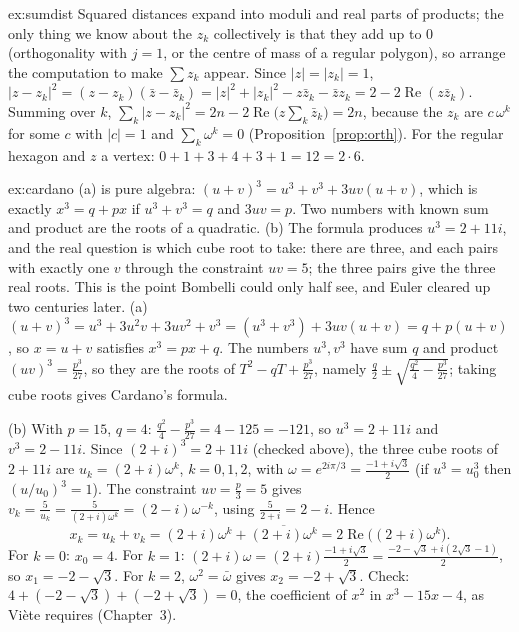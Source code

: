 \begin{solution}{ex:sumdist}
\idea Squared distances expand into moduli and real parts of products; the only thing we know about the $z_k$ collectively is that they add up to $0$ (orthogonality with $j=1$, or the centre of mass of a regular polygon), so arrange the computation to make $\sum z_k$ appear.
\writeup Since $|z|=|z_k|=1$, $|z-z_k|^2=(z-z_k)(\bar z-\bar z_k)=|z|^2+|z_k|^2-z\bar z_k-\bar zz_k=2-2\operatorname{Re}(z\bar z_k)$. Summing over $k$,
$\sum_k|z-z_k|^2=2n-2\operatorname{Re}\bigl(z\sum_k\bar z_k\bigr)=2n$, because the $z_k$ are $c\,\omega^k$ for some $c$ with $|c|=1$ and $\sum_k\omega^k=0$ (Proposition~\ref{prop:orth}). For the regular hexagon and $z$ a vertex: $0+1+3+4+3+1=12=2\cdot6$.
\end{solution}

\begin{solution}{ex:cardano}
\idea (a) is pure algebra: $(u+v)^3=u^3+v^3+3uv(u+v)$, which is exactly $x^3=q+px$ if $u^3+v^3=q$ and $3uv=p$. Two numbers with known sum and product are the roots of a quadratic. (b) The formula produces $u^3=2+11i$, and the real question is which cube root to take: there are three, and each pairs with exactly one $v$ through the constraint $uv=5$; the three pairs give the three real roots. This is the point Bombelli could only half see, and Euler cleared up two centuries later.
\writeup (a) $(u+v)^3=u^3+3u^2v+3uv^2+v^3=(u^3+v^3)+3uv(u+v)=q+p(u+v)$, so $x=u+v$ satisfies $x^3=px+q$. The numbers $u^3,v^3$ have sum $q$ and product $(uv)^3=\frac{p^3}{27}$, so they are the roots of $T^2-qT+\frac{p^3}{27}$, namely $\frac q2\pm\sqrt{\frac{q^2}4-\frac{p^3}{27}}$; taking cube roots gives Cardano's formula.

(b) With $p=15$, $q=4$: $\frac{q^2}4-\frac{p^3}{27}=4-125=-121$, so $u^3=2+11i$ and $v^3=2-11i$. Since $(2+i)^3=2+11i$ (checked above), the three cube roots of $2+11i$ are $u_k=(2+i)\omega^k$, $k=0,1,2$, with $\omega=e^{2i\pi/3}=\frac{-1+i\sqrt3}2$ (if $u^3=u_0^3$ then $(u/u_0)^3=1$). The constraint $uv=\frac p3=5$ gives $v_k=\frac5{u_k}=\frac{5}{(2+i)\omega^k}=(2-i)\omega^{-k}$, using $\frac5{2+i}=2-i$. Hence
\[
x_k=u_k+v_k=(2+i)\omega^k+\overline{(2+i)\omega^k}=2\operatorname{Re}\bigl((2+i)\omega^k\bigr).
\]
For $k=0$: $x_0=4$. For $k=1$: $(2+i)\omega=(2+i)\frac{-1+i\sqrt3}2=\frac{-2-\sqrt3+i(2\sqrt3-1)}2$, so $x_1=-2-\sqrt3$. For $k=2$, $\omega^2=\bar\omega$ gives $x_2=-2+\sqrt3$. Check: $4+(-2-\sqrt3)+(-2+\sqrt3)=0$, the coefficient of $x^2$ in $x^3-15x-4$, as Vi\`ete requires (Chapter~3).
\end{solution}

